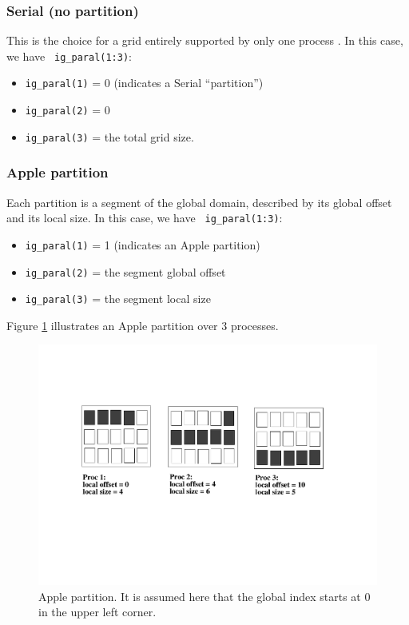 \subsubsection{Serial (no partition)}

This is the choice for a grid entirely supported by only one process . In this case, we have {\tt
  ig\_paral(1:3)}:
\begin{itemize}
\item {\tt ig\_paral(1)} = 0 (indicates a Serial ``partition'')
\item {\tt ig\_paral(2)} = 0
\item {\tt ig\_paral(3)} = the total grid size.
\end{itemize}

\subsubsection{Apple partition}

Each partition is a segment of the global domain, described by its
global offset and its local size. In this case, we have {\tt
  ig\_paral(1:3)}:
\begin{itemize}
\item {\tt ig\_paral(1)} = 1 (indicates an Apple partition)
\item {\tt ig\_paral(2)} = the segment global offset
\item {\tt ig\_paral(3)} = the segment local size
\end{itemize}

Figure \ref{apple_partition} illustrates an Apple partition over 3
processes.
\begin{figure}
  \includegraphics[scale=.6]{figures/apple_new}
  \caption{Apple partition. It is assumed here that the global index starts at
    0 in the upper left corner.}
  \label{apple_partition}
\end{figure}



